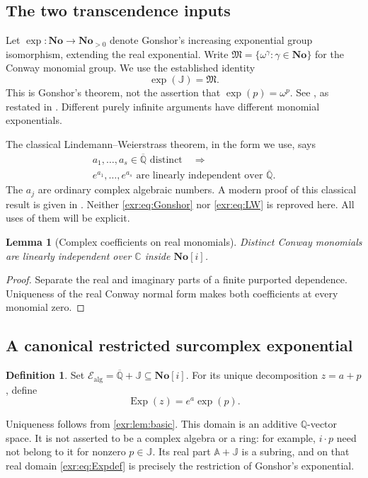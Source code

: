 \documentclass[11pt,letterpaper]{article}
\numberwithin{equation}{section}
\newtheorem{lemma}[lemma]{Lemma}
\theoremstyle{definition}
\newtheorem{definition}[definition]{Definition}
\theoremstyle{remark}
\newcommand{\No}{\mathbf{No}}
\newcommand{\SC}{\mathbf{No}[i]}
\newcommand{\Q}{\mathbb Q}
\newcommand{\C}{\mathbb C}
\newcommand{\A}{\mathbb A}
\newcommand{\Qb}{\overline{\mathbb Q}}
\newcommand{\J}{\mathbb J}
\newcommand{\M}{\mathfrak M}
\newcommand{\Ealg}{\mathcal E_{\mathrm{alg}}}
\newcommand{\Exp}{\operatorname{Exp}}
\begin{document}
\subsection{The two transcendence inputs}
Let $\exp:\No\to\No_{>0}$ denote Gonshor's increasing exponential group
isomorphism, extending the real exponential. Write
$\M=\{\omega^\gamma:\gamma\in\No\}$ for the Conway monomial group.
We use the established identity
\begin{equation}\label{exr:eq:Gonshor} \exp(\J)=\M. \end{equation}
This is Gonshor's theorem, not the assertion that $\exp(p)=\omega^p$.
See \cite[Theorems~10.8--10.13]{gonshor}, as restated in
\cite[Theorem~2.16]{mantova}. Different purely infinite arguments have different
monomial exponentials.

The classical Lindemann--Weierstrass theorem, in the form we use, says
\begin{equation}\label{exr:eq:LW}
 \begin{gathered}
 a_1,\ldots,a_s\in\Qb\text{ distinct}\quad\Longrightarrow\\
 e^{a_1},\ldots,e^{a_s}\text{ are linearly independent over }\Qb.
 \end{gathered}
\end{equation}
The $a_j$ are ordinary complex algebraic numbers. A modern proof of this classical
result is given in \cite{popescu}. Neither \eqref{exr:eq:Gonshor} nor \eqref{exr:eq:LW} is
reproved here. All uses of them will be explicit.

\begin{lemma}[Complex coefficients on real monomials]\label{exr:lem:monomial}
Distinct Conway monomials are linearly independent over $\C$ inside $\SC$.
\end{lemma}
\begin{proof}
Separate the real and imaginary parts of a finite purported dependence. Uniqueness
of the real Conway normal form makes both coefficients at every monomial zero.
\end{proof}

\subsection{A canonical restricted surcomplex exponential}
\begin{definition}\label{exr:def:domain}
Set $\Ealg=\Qb+\J\subseteq\SC$. For its unique decomposition $z=a+p$, define
\begin{equation}\label{exr:eq:Expdef} \Exp(z)=e^a\exp(p). \end{equation}
\end{definition}
Uniqueness follows from \cref{exr:lem:basic}. This domain is an additive $\Q$-vector
space. It is not asserted to be a complex algebra or a ring: for example,
$i\cdot p$ need not belong to it for nonzero $p\in\J$. Its real part
$\A+\J$ is a subring, and on that real domain \eqref{exr:eq:Expdef} is precisely the
restriction of Gonshor's exponential.
\end{document}
